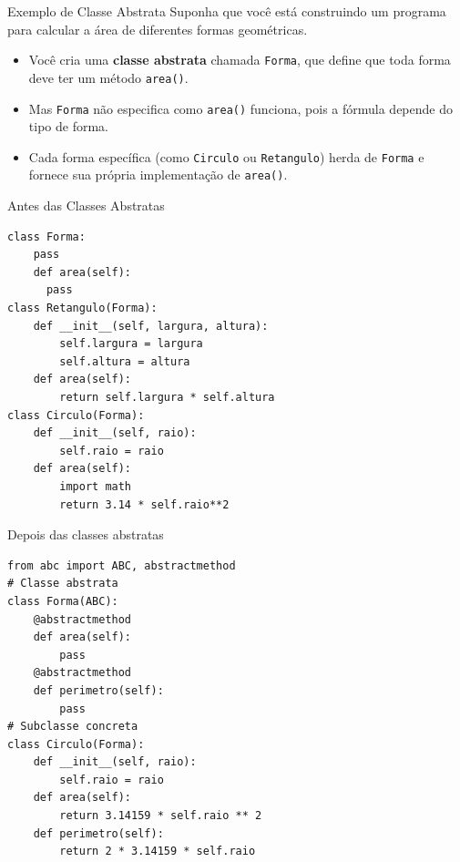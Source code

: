 \begin{frame}{Exemplo de Classe Abstrata}
    Suponha que você está construindo um programa para calcular a área de diferentes formas geométricas.

    \begin{itemize}
        \item Você cria uma \textbf{classe abstrata} chamada \texttt{Forma}, que define que toda forma deve ter um método \texttt{area()}.
        \item Mas \texttt{Forma} não especifica como \texttt{area()} funciona, pois a fórmula depende do tipo de forma.
        \item Cada forma específica (como \texttt{Circulo} ou \texttt{Retangulo}) herda de \texttt{Forma} e fornece sua própria implementação de \texttt{area()}.
    \end{itemize}
\end{frame}

\begin{frame}[fragile]{Antes das Classes Abstratas}

    \small
    \begin{verbatim}
class Forma:
    pass
    def area(self):
      pass
class Retangulo(Forma):
    def __init__(self, largura, altura):
        self.largura = largura
        self.altura = altura
    def area(self):
        return self.largura * self.altura
class Circulo(Forma):
    def __init__(self, raio):
        self.raio = raio
    def area(self):
        import math
        return 3.14 * self.raio**2
\end{verbatim}

\end{frame}

\begin{frame}[fragile]{Depois das classes abstratas}

    \small
    \begin{verbatim}
from abc import ABC, abstractmethod
# Classe abstrata
class Forma(ABC):
    @abstractmethod
    def area(self):
        pass
    @abstractmethod
    def perimetro(self):
        pass
# Subclasse concreta
class Circulo(Forma):
    def __init__(self, raio):
        self.raio = raio
    def area(self):
        return 3.14159 * self.raio ** 2
    def perimetro(self):
        return 2 * 3.14159 * self.raio
\end{verbatim}

\end{frame}

